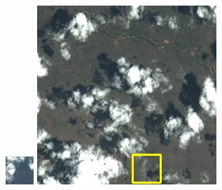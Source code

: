 \documentclass[10pt]{ctexart}
\begin{document}
\begin{multicols}{2}
\begin{figure}[H]
{\begin{minipage}[b]{0.15\linewidth}
            \includegraphics[width=1\linewidth]{../log/spoon2/cut/tmp_cut_LC80350192014190LGN00_06561_color.jpg}\vspace{4pt}
            \includegraphics[width=1\linewidth]{../log/spoon2/cut/LC80980712014024LGN00_15443_color.jpg}\vspace{4pt}

\end{minipage}}
\end{figure}
\end{multicols}
\end{document}

